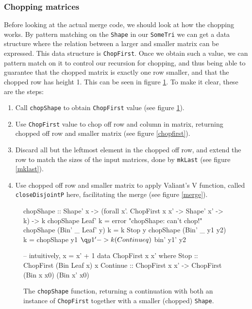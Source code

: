 \documentclass[a4paper,12pt,notitlepage]{report}
\begin{document}
\subsubsection{Chopping matrices}
Before looking at the actual merge code, we should look at how the chopping
works. By pattern matching on the \texttt{Shape} in our \texttt{SomeTri} we can
get a data structure where the relation between a larger and smaller matrix can
be expressed. This data structure is \texttt{ChopFirst}. Once we obtain such a
value, we can pattern match on it to control our recursion for chopping, and
thus being able to guarantee that the chopped matrix is exactly one row smaller,
and that the chopped row has height 1. This can be seen in figure
\ref{chopshape}. To make it clear, these are the steps:
\begin{enumerate}
    \item Call \texttt{chopShape} to obtain \texttt{ChopFirst} value (see figure
          \ref{chopshape}).
    \item Use \texttt{ChopFirst} value to chop off row and column in matrix,
          returning chopped off row and smaller matrix (see figure
          \ref{chopfirst}).
    \item Discard all but the leftmost element in the chopped off row, and
          extend the row to match the sizes of the input matrices, done by
          \texttt{mkLast} (see figure \ref{mklast}).
    \item Use chopped off row and smaller matrix to apply Valiant's V function,
          called \texttt{closeDisjointP} here, facilitating the merge (see
          figure \ref{merge}).
\end{enumerate}

\begin{figure}[H]
\begin{code}
chopShape :: Shape' x 
          -> (forall x'. ChopFirst x x' -> Shape' x' -> k) -> k
chopShape Leaf' k = error "chopShape: can't chop!"
chopShape (Bin' _ Leaf' y) k = k Stop y
chopShape (Bin' _ y1 y2) k = 
    chopShape y1 $ \q y1' -> k (Continue q) $ bin' y1' y2

-- intuitively, x = x' + 1
data ChopFirst x x' where
  Stop :: ChopFirst (Bin Leaf x) x
  Continue :: ChopFirst x x' -> ChopFirst (Bin x x0) (Bin x' x0)
\end{code}
\caption{\label{chopshape} \small The \texttt{chopShape} function, returning a
continuation with both an instance of \texttt{ChopFirst} together with a smaller
(chopped) \texttt{Shape}.}
\end{figure}
\end{document}
